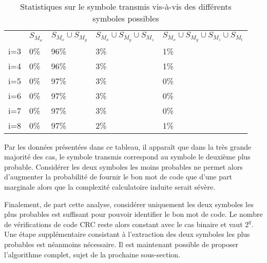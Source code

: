 \begin{table}[!tb]
    \centering
    \caption{Statistiques sur le symbole transmis vis-à-vis des différents symboles possibles}
    \label{tab:symb}
        \begin{tabular}{rllll}
            \toprule
            		& $S_{M_x}$	& $S_{M_x}\cup S_{M_y}$	& $S_{M_x}\cup S_{M_y}\cup S_{M_z}$ & $S_{M_x}\cup S_{M_y}\cup S_{M_z}\cup S_{M_t}$ \\
            \cmidrule(l){2-2}\cmidrule(l){3-3}\cmidrule(l){4-4}\cmidrule(l){5-5}
            i=3     &	0\%		&	96\%	& 	3\%		&	1\%		\\
            i=4     &	0\%		&	96\%	& 	3\%		&	1\%		\\
            i=5     &	0\%		&	97\%	& 	3\%		&	0\%		\\
            i=6     &	0\%		&	97\%	& 	3\%		&	0\%		\\
            i=7     &	0\%		&	97\%	& 	3\%		&	0\%		\\
            i=8     &	0\%		&	97\%	& 	2\%		&	1\%	\\
            \bottomrule
        \end{tabular}%
\end{table}
 
Par les données présentées dans ce tableau, il apparaît que dans la très grande majorité des cas, le symbole transmis 
correspond au symbole le deuxième plus probable. Considérer les deux symboles les moins probables ne permet alors 
d'augmenter la probabilité de fournir le bon mot de code que d'une part marginale alors que la complexité calculatoire
induite serait sévère.

Finalement, de part cette analyse, considérer uniquement les deux symboles les plus probables est suffisant pour 
pouvoir identifier le bon mot de code. Le nombre de vérifications de code CRC reste alors constant avec le cas binaire 
et vaut $2^q$. Une étape supplémentaire consistant à l'extraction des deux symboles les plus probables est néanmoins 
nécessaire. Il est maintenant possible de proposer l'algorithme complet, sujet de la prochaine sous-section.

